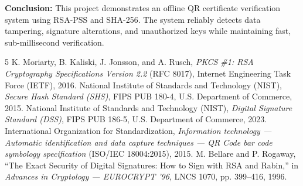 \documentclass[10pt,a4paper]{article}
\begin{document}
\noindent \textbf{Conclusion:} This project demonstrates an offline QR certificate verification system using RSA-PSS and SHA-256. The system reliably detects data tampering, signature alterations, and unauthorized keys while maintaining fast, sub-millisecond verification.

\begin{thebibliography}{5}
\setlength{\itemsep}{0pt}
\setlength{\parskip}{0pt}
\small
{} K. Moriarty, B. Kaliski, J. Jonsson, and A. Rusch, \textit{PKCS \#1: RSA Cryptography Specifications Version 2.2} (RFC 8017), Internet Engineering Task Force (IETF), 2016.
 National Institute of Standards and Technology (NIST), \textit{Secure Hash Standard (SHS)}, FIPS PUB 180-4, U.S. Department of Commerce, 2015.
 National Institute of Standards and Technology (NIST), \textit{Digital Signature Standard (DSS)}, FIPS PUB 186-5, U.S. Department of Commerce, 2023.
 International Organization for Standardization, \textit{Information technology --- Automatic identification and data capture techniques --- QR Code bar code symbology specification} (ISO/IEC 18004:2015), 2015.
 M. Bellare and P. Rogaway, ``The Exact Security of Digital Signatures: How to Sign with RSA and Rabin,'' in \textit{Advances in Cryptology --- EUROCRYPT '96}, LNCS 1070, pp. 399--416, 1996.
\end{thebibliography}
\end{document}
